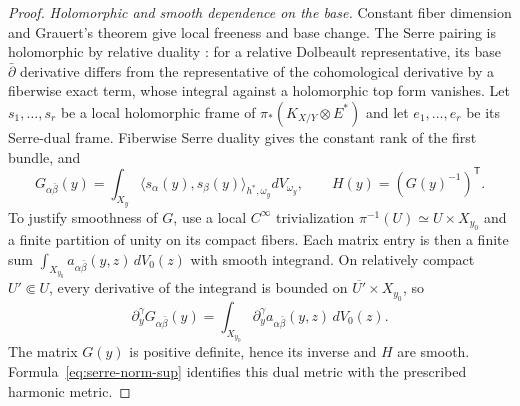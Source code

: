 \documentclass[11pt,reqno]{amsart}
\numberwithin{equation}{section}
\theoremstyle{definition}
\theoremstyle{remark}
\begin{document}
\begin{proof}
\emph{Holomorphic and smooth dependence on the base.}
Constant fiber dimension and Grauert's theorem \cite{Gra60} give local freeness
and base change.  The Serre pairing is holomorphic by relative duality
\cite{RRV71}: for a relative
Dolbeault representative, its base $\bar\partial$ derivative differs
from the representative of the cohomological derivative by a
fiberwise exact term, whose integral against a holomorphic top form
vanishes.  Let $s_1,\ldots,s_r$ be a local holomorphic frame of
$\pi_*(K_{X/Y}\otimes E^*)$ and let $e_1,\ldots,e_r$ be its
Serre-dual frame.  Fiberwise Serre duality gives the constant rank
of the first bundle, and
\[
 G_{\alpha\bar\beta}(y)
 =\int_{X_y}\langle s_\alpha(y),s_\beta(y)\rangle_{h^*,\omega_y}
                 dV_{\omega_y},\qquad
 H(y)=(G(y)^{-1})^{\mathsf T}.
\]
To justify smoothness of $G$, use a local $C^\infty$ trivialization
$\pi^{-1}(U)\simeq U\times X_{y_0}$ and a finite partition of unity
on its compact fibers.  Each matrix entry is then a finite sum
$\int_{X_{y_0}}a_{\alpha\bar\beta}(y,z)\,dV_0(z)$ with smooth
integrand.  On relatively compact $U'\Subset U$, every derivative
of the integrand is bounded on $\overline{U'}\times X_{y_0}$, so
\[
 \partial_y^\gamma G_{\alpha\bar\beta}(y)
 =\int_{X_{y_0}}\partial_y^\gamma
       a_{\alpha\bar\beta}(y,z)\,dV_0(z).
\]
The matrix $G(y)$ is positive definite, hence its inverse and $H$
are smooth.  Formula~\eqref{eq:serre-norm-sup} identifies this dual
metric with the prescribed harmonic metric.
\end{proof}
\end{document}
